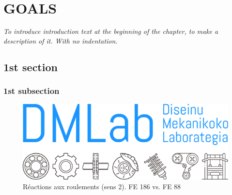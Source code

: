 
\chapter{GOALS} %
\label{Goals}

\vspace*{3\baselineskip} %

\noindent \textit{To introduce introduction text at the beginning of the chapter, to make a description of it. With no indentation.}

\section{1st section}

\blindtext

\subsection{1st subsection}


\begin{figure}[!htb]\centering	
\includegraphics[width=0.69\linewidth]{Figures/Logo_DMLab2.png}
    \caption{Réactions aux roulements (sens 2). FE 186 vs. FE 88}
    \label{reac_FE88}
\end{figure} 